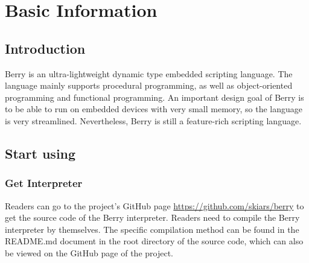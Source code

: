 \chapter{Basic Information}

\section {Introduction}

Berry is an ultra-lightweight dynamic type embedded scripting language. The language mainly supports procedural programming, as well as object-oriented programming and functional programming. An important design goal of Berry is to be able to run on embedded devices with very small memory, so the language is very streamlined. Nevertheless, Berry is still a feature-rich scripting language.

\section{Start using}

\subsection{Get Interpreter}

Readers can go to the project's GitHub page \url{https://github.com/skiars/berry} to get the source code of the Berry interpreter. Readers need to compile the Berry interpreter by themselves. The specific compilation method can be found in the README.md document in the root directory of the source code, which can also be viewed on the GitHub page of the project.


